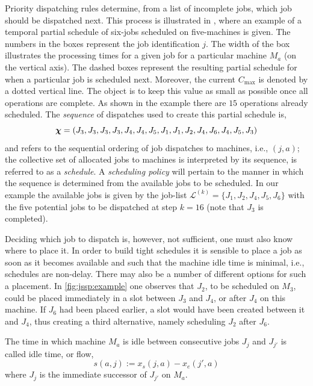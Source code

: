 \documentclass[smallextended]{svjour3}
\begin{document}
Priority dispatching rules determine, from a list of incomplete jobs, which job should be dispatched next. This process is illustrated in , where an example of 
a temporal partial schedule of six-jobs scheduled on five-machines is given. 
The numbers in the boxes represent the job identification $j$. 
The width of the box illustrates the processing times for a given job for a 
particular machine $M_a$ (on the vertical axis). 
The dashed boxes represent the resulting partial schedule for when a particular 
job is scheduled next. 
Moreover, the current $C_{\max}$ is denoted by a dotted vertical line. 
The object is to keep this value as small as possible once all operations are 
complete. As shown in the example there are $15$ operations already scheduled. 
The \textit{sequence} of dispatches used to create this partial schedule is,
\begin{equation}
	\bm \chi=\left(J_3,J_3,J_3,J_3,J_4,J_4,J_5,J_1,J_1,J_2,J_4,J_6,J_4,J_5,J_3\right)
\end{equation}
and refers to the sequential ordering of job dispatches to machines, i.e., $(j,a)$; 
the collective set of allocated jobs to machines is interpreted by its 
sequence, is referred to as a \emph{schedule}.
A \emph{scheduling policy} will pertain to the manner in which 
the sequence is determined from the available jobs to be scheduled. 
In our example the available jobs is given by the job-list
$\mathcal{L}^{(k)}=\{J_1,J_2,J_4,J_5,J_6\}$ with the five potential jobs 
to be dispatched at step $k=16$ (note that $J_3$ is completed).

Deciding which job to dispatch is, however, not sufficient, one must also know 
where to place it. In order to build tight schedules it is sensible to place a 
job as soon as it becomes available and such that the machine idle time is 
minimal, i.e., schedules are non-delay. 
There may also be a number of different options for such a placement. 
In \cref{fig:jssp:example} one observes that $J_2$, to be scheduled on $M_3$, 
could be placed immediately in a slot between $J_3$ and $J_4$, or after $J_4$ 
on this machine. 
If $J_6$ had been placed earlier, a slot would have been created between it and 
$J_4$, thus creating a third alternative, namely scheduling $J_2$ after $J_6$. 

The time in which machine $M_a$ is idle between consecutive jobs $J_j$ and 
$J_{j'}$ is called idle time, or flow, \begin{equation} 
s(a,j):=x_s(j,a)-x_e(j',a) \label{eq:slack}\end{equation}
where $J_j$ is the immediate successor of $J_{j'}$ on $M_a$. 
\end{document}
